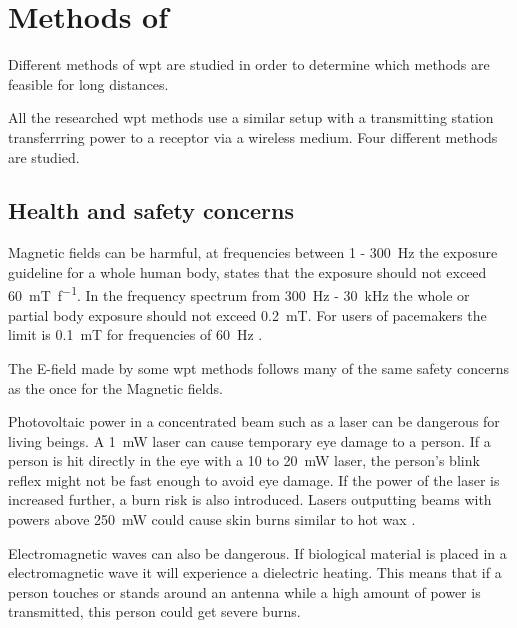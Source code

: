 \section{Methods of }\label{sec:WPTmethods}
Different methods of \gls{wpt} are studied in order to determine which methods are feasible for long distances.

All the researched \gls{wpt} methods use a similar setup with a transmitting station transferrring power to a receptor via a wireless medium. Four different methods are studied.
 






\subsection{Health and safety concerns}
Magnetic fields can be harmful, at frequencies between 1 - \SI{300}{\hertz} the exposure guideline for a whole human body, states that the exposure should not exceed \SI{60}{\milli\tesla\per f}. In the frequency spectrum from \SI{300}{\hertz} - \SI{30}{\kilo\hertz} the whole or partial body exposure should not exceed \SI{0.2}{\milli\tesla}. For users of pacemakers the limit is \SI{0.1}{\milli\tesla} for frequencies of \SI{60}{\hertz} \cite{web:MagneticFieldSafty}.

The E-field made by some \gls{wpt} methods follows many of the same safety concerns as the once for the Magnetic fields.

Photovoltaic power in a concentrated beam such as a laser can be dangerous for living beings. A \SI{1}{\milli\watt} laser can cause temporary eye damage to a person. If a person is hit directly in the eye with a 10 to \SI{20}{\milli\watt} laser, the person's blink reflex might not be fast enough to avoid eye damage. If the power of the laser is increased further, a burn risk is also introduced. Lasers outputting beams with powers above \SI{250}{\milli\watt} could cause skin burns similar to hot wax \cite{web:LaserSafty}.

Electromagnetic waves can also be dangerous. If biological material is placed in a electromagnetic wave it will experience a dielectric heating. This means that if a person touches or stands around an antenna while a high amount of power is transmitted, this person could get severe burns.



